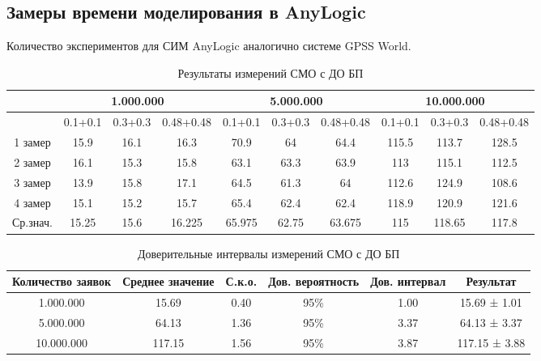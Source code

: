 \documentclass[a4paper,14pt]{report} %
\begin{document}
\subsection{Замеры времени моделирования в AnyLogic}
Количество экспериментов для СИМ AnyLogic аналогично системе GPSS World.

\begin{table}[h!]
\caption{Результаты измерений СМО с ДО БП}
\begin{tabular}{|c|c|c|c|c|c|c|c|c|c|}
\hline
 & \multicolumn{3}{|c|}{1.000.000} & \multicolumn{3}{|c|}{5.000.000} & \multicolumn{3}{|c|}{10.000.000} \\
\hline
 & 0.1+0.1 & 0.3+0.3 & 0.48+0.48 & 0.1+0.1 & 0.3+0.3 & 0.48+0.48 & 0.1+0.1 & 0.3+0.3 & 0.48+0.48 \\
\hline
1 замер & 15.9 & 16.1 & 16.3 & 70.9 & 64 & 64.4 & 115.5 & 113.7 & 128.5 \\
\hline
2 замер & 16.1 & 15.3 & 15.8 & 63.1 & 63.3 & 63.9 & 113 & 115.1 & 112.5 \\
\hline
3 замер & 13.9 & 15.8 & 17.1 & 64.5 & 61.3 & 64 & 112.6 & 124.9 & 108.6 \\
\hline
4 замер & 15.1 & 15.2 & 15.7 & 65.4 & 62.4 & 62.4 & 118.9 & 120.9 & 121.6 \\
\hline
Ср.знач. & 15.25 & 15.6 & 16.225 & 65.975 & 62.75 & 63.675 & 115 & 118.65 & 117.8 \\
\hline
\end{tabular}
\end{table} 

\begin{table}[h!]
\caption{Доверительные интервалы измерений СМО с ДО БП}
\begin{tabular}{|c|c|c|c|c|c|}
\hline
 Количество заявок & Среднее значение & С.к.о. & Дов. вероятность & Дов. интервал & Результат\\
\hline
1.000.000 & 15.69 & 0.40 & 95\% & 1.00 & 15.69 ± 1.01 \\
\hline
5.000.000 & 64.13 & 1.36 & 95\% & 3.37 & 64.13 ± 3.37 \\
\hline
10.000.000 & 117.15 & 1.56 & 95\% &3.87 & 117.15 ± 3.88 \\
\hline
\end{tabular}
\end{table} 
\end{document}
